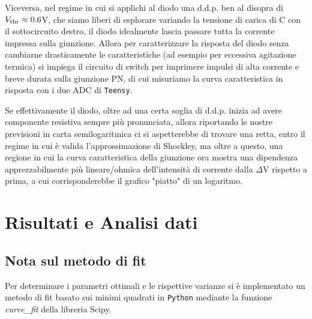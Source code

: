 \documentclass{article}[a4paper, oneside, 11pt]
\begin{document}
Viceversa, nel regime in cui si applichi al diodo una d.d.p. ben al disopra di $V_{\rm thr} \approx 0.6 $V, che siamo liberi di esplorare variando la tensione di carica di C con il sottocircuito destro, il diodo idealmente lascia passare tutta la corrente impressa sulla giunzione. Allora per caratterizzare la risposta del diodo senza cambiarne drasticamente le caratteristiche (ad esempio per eccessiva agitazione termica) si impiega il circuito di switch per imprimere impulsi di alta corrente e breve durata sulla giunzione PN, di cui misuriamo la curva caratteristica in risposta con i due ADC di \verb+Teensy+. 

Se effettivamente il diodo, oltre ad una certa soglia di d.d.p. inizia ad avere componente resistiva sempre più pronunciata, allora riportando le nostre previsioni in carta semilogaritmica ci si aspetterebbe di trovare una retta, entro il regime in cui è valida l'approssimazione di Shockley, ma oltre a questo, una regione in cui la curva caratteristica della giunzione ora mostra una dipendenza apprezzabilmente più lineare/ohmica dell'intensità di corrente dalla $\Delta$V rispetto a prima, a cui corrisponderebbe il grafico "piatto" di un logaritmo.  \section{Risultati e Analisi dati}
\subsection{Nota sul metodo di fit}
Per determinare i parametri ottimali e le rispettive varianze si \`e implementato un metodo di fit basato sui minimi quadrati in \verb+Python+ mediante la funzione \emph{curve\_fit} della libreria Scipy\cite{scipy}.
\medskip


\end{document}
